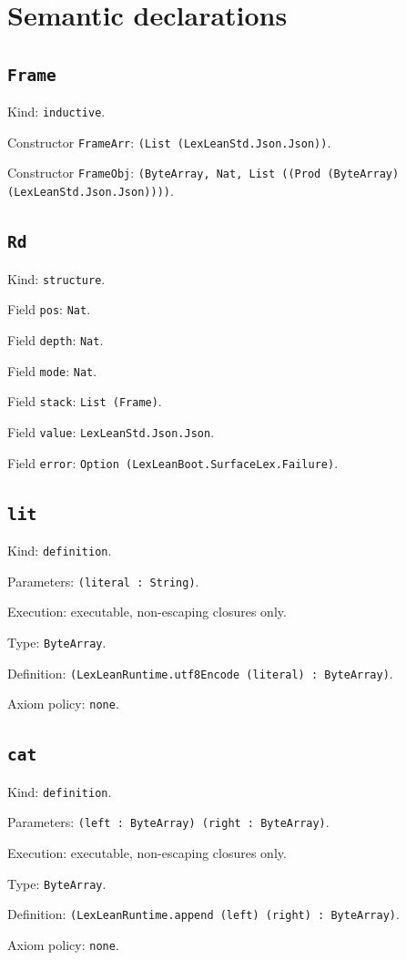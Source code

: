 \documentclass[11pt]{article}
\begin{document}
\section*{Semantic declarations}
\subsection*{\texttt{Frame}}
\noindent Kind: \texttt{inductive}.\par
\noindent Constructor \texttt{FrameArr}: \texttt{(List (LexLeanStd.Json.Json))}.\par
\noindent Constructor \texttt{FrameObj}: \texttt{(ByteArray, Nat, List ((Prod (ByteArray) (LexLeanStd.Json.Json))))}.\par
\subsection*{\texttt{Rd}}
\noindent Kind: \texttt{structure}.\par
\noindent Field \texttt{pos}: \texttt{Nat}.\par
\noindent Field \texttt{depth}: \texttt{Nat}.\par
\noindent Field \texttt{mode}: \texttt{Nat}.\par
\noindent Field \texttt{stack}: \texttt{List (Frame)}.\par
\noindent Field \texttt{value}: \texttt{LexLeanStd.Json.Json}.\par
\noindent Field \texttt{error}: \texttt{Option (LexLeanBoot.SurfaceLex.Failure)}.\par
\subsection*{\texttt{lit}}
\noindent Kind: \texttt{definition}.\par
\noindent Parameters: \texttt{(literal : String)}.\par
\noindent Execution: executable, non-escaping closures only.\par
\noindent Type: \texttt{ByteArray}.\par
\noindent Definition: \texttt{(LexLeanRuntime.utf8Encode (literal) : ByteArray)}.\par
\noindent Axiom policy: \texttt{none}.\par
\subsection*{\texttt{cat}}
\noindent Kind: \texttt{definition}.\par
\noindent Parameters: \texttt{(left : ByteArray) (right : ByteArray)}.\par
\noindent Execution: executable, non-escaping closures only.\par
\noindent Type: \texttt{ByteArray}.\par
\noindent Definition: \texttt{(LexLeanRuntime.append (left) (right) : ByteArray)}.\par
\noindent Axiom policy: \texttt{none}.\par
\end{document}
